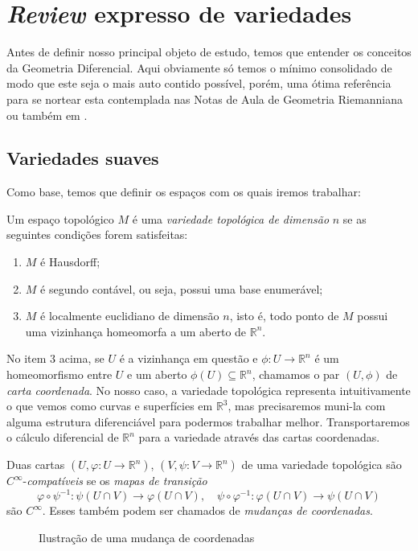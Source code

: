 \section{\textit{Review} expresso de variedades}
\label{sec: 2}
Antes de definir nosso principal objeto de estudo, temos que entender os conceitos da Geometria Diferencial. Aqui obviamente só temos o mínimo consolidado de modo que este seja o mais auto contido possível, porém, uma ótima referência para se nortear esta contemplada nas Notas de Aula de Geometria Riemanniana \cite{malex2022} ou também em \cite{munkres2018analysis}. 

\subsection{Variedades suaves}

Como base, temos que definir os espaços com os quais iremos trabalhar:

\begin{definicao}
	Um espaço topológico $M$ é uma \textit{variedade topológica de dimensão} $n$ se as seguintes condições forem satisfeitas:
	\begin{enumerate}
		\item $M$ é Hausdorff;
		\item $M$ é segundo contável, ou seja, possui uma base enumerável;
		\item $M$ é localmente euclidiano de dimensão $n$, isto é, todo ponto de $M$ possui uma vizinhança homeomorfa a um aberto de $\mathbb R^n$.
	\end{enumerate}
\end{definicao}

No item 3 acima, se $U$ é a vizinhança em questão e $\phi: U \longrightarrow \mathbb R^n$ é um homeomorfismo entre $U$ e um aberto $\phi(U) \subseteq \mathbb R^n$, chamamos o par $(U, \phi)$ de \textit{carta coordenada}. No nosso caso, a variedade topológica representa intuitivamente o que vemos como curvas e superfícies em $\mathbb R^3$, mas precisaremos muni-la com alguma estrutura diferenciável para podermos trabalhar melhor. Transportaremos o cálculo diferencial de $\mathbb R^n$ para a variedade através das cartas coordenadas.

\begin{definicao}
	Duas cartas $(U, \varphi: U \longrightarrow \mathbb R^n)$, $(V, \psi: V \longrightarrow \mathbb R^n)$ de uma variedade topológica são $C^{\infty}$-\textit{compatíveis} se os \textit{mapas de transição}
	\[
	\varphi \circ \psi^{-1}: \psi(U \cap V) \longrightarrow \varphi(U \cap V), \quad \psi \circ \varphi^{-1}: \varphi(U \cap V) \longrightarrow \psi(U \cap V)
	\]
	são $C^{\infty}$. Esses também podem ser chamados de \textit{mudanças de coordenadas}.
	\begin{figure}[H]
		\centering
		
		\caption{Ilustração de uma mudança de coordenadas}
		\label{fig: troca de coordenadas}
	\end{figure}
\end{definicao}



